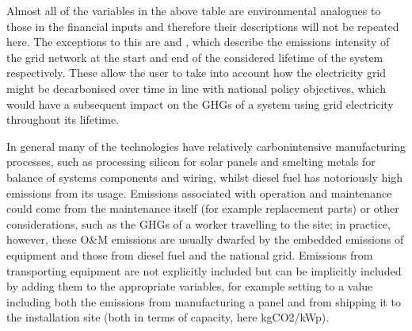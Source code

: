 \documentclass[letterpaper,10pt,english]{sphinxmanual}
\begin{document}
\sphinxAtStartPar
Almost all of the variables in the above table are environmental
analogues to those in the financial inputs and therefore their
descriptions will not be repeated here. The exceptions to this are
 and , which describe the
emissions intensity of the grid network at the start and end of the
considered lifetime of the system respectively. These allow the user to
take into account how the electricity grid might be decarbonised over
time in line with national policy objectives, which would have a
subsequent impact on the GHGs of a system using grid electricity
throughout its lifetime.

\sphinxAtStartPar
In general many of the technologies have relatively carbon\sphinxhyphen{}intensive
manufacturing processes, such as processing silicon for solar panels and
smelting metals for balance of systems components and wiring, whilst
diesel fuel has notoriously high emissions from its usage. Emissions
associated with operation and maintenance could come from the
maintenance itself (for example replacement parts) or other
considerations, such as the GHGs of a worker travelling to the site; in
practice, however, these O\&M emissions are usually dwarfed by the
embedded emissions of equipment and those from diesel fuel and the
national grid. Emissions from transporting equipment are not explicitly
included but can be implicitly included by adding them to the
appropriate variables, for example setting  to a value
including both the emissions from manufacturing a panel and from
shipping it to the installation site (both in terms of capacity, here
kgCO2/kWp).

\sphinxAtStartPar
{}  
\end{document}
